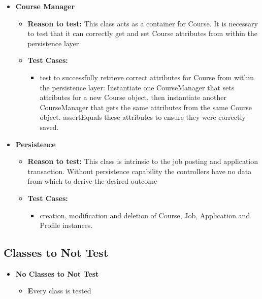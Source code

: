 \documentclass[12pt]{report}
\begin{document}
    	\begin{itemize}
    		\item \textbf{Course Manager}
    		\begin{itemize}
    			\item \textbf{Reason to test:} This class acts as a container for Course. It is necessary to test that it can correctly get and set Course attributes from within the persistence layer.
    			\item \textbf{Test Cases:} 
    			\begin{itemize}
    				\item test to successfully retrieve correct attributes for Course from within the persistence layer: Instantiate one CourseManager that sets attributes for a new Course object, then instantiate another CourseManager that gets the same attributes from the same Course object. assertEquals these attributes to ensure they were correctly saved.
    			\end{itemize}
    			
    		\end{itemize}
    	\end{itemize}
        
        \begin{itemize}
        \item \textbf{Persistence}
        \begin{itemize}
            \item \textbf{Reason to test:} This class is intrinsic to the job posting and application transaction. Without persistence capability the controllers have no data from which to derive the desired outcome
            \item \textbf{Test Cases:} 
            \begin{itemize}
                \item creation, modification and deletion of Course, Job, Application and Profile instances. 
            \end{itemize}
        \end{itemize}
        
    \end{itemize}
    
    \subsection{Classes to Not Test}
    \begin{itemize}
    	\item \textbf{No Classes to Not Test}
    	\begin{itemize}
    		\item \textbf Every class is tested
    	\end{itemize}
    \end{itemize}
    
\end{document}
